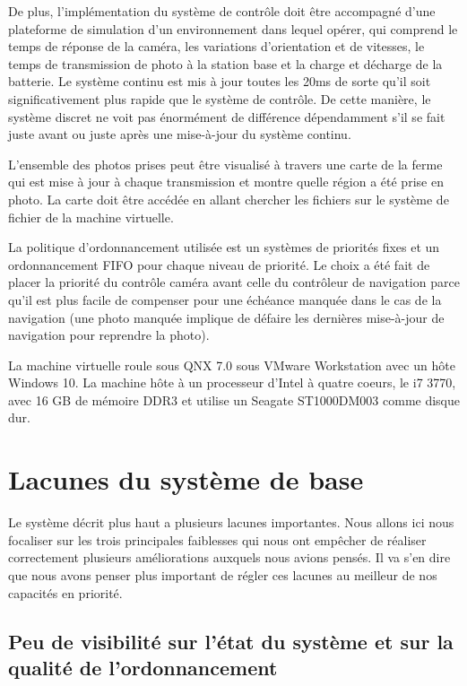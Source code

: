\documentclass[journal]{IEEEtran}
\begin{document}
De plus, l'implémentation du système de contrôle doit être accompagné d'une plateforme de simulation d'un environnement dans lequel opérer, qui comprend le temps de réponse de la caméra, les variations d'orientation et de vitesses, le temps de transmission de photo à la station base et la charge et décharge de la batterie. Le système continu est mis à jour toutes les 20ms de sorte qu'il soit significativement plus rapide que le système de contrôle. De cette manière, le système discret ne voit pas énormément de différence dépendamment s'il se fait juste avant ou juste après une mise-à-jour du système continu.

L'ensemble des photos prises peut être visualisé à travers une carte de la ferme qui est mise à jour à chaque transmission et montre quelle région a été prise en photo. La carte doit être accédée en allant chercher les fichiers sur le système de fichier de la machine virtuelle.

La politique d'ordonnancement utilisée est un systèmes de priorités fixes et un ordonnancement FIFO pour chaque niveau de priorité. Le choix a été fait de placer la priorité du contrôle caméra avant celle du contrôleur de navigation parce qu'il est plus facile de compenser pour une échéance manquée dans le cas de la navigation (une photo manquée implique de défaire les dernières mise-à-jour de navigation pour reprendre la photo).

La machine virtuelle roule sous QNX 7.0 sous VMware Workstation avec un hôte Windows 10. La machine hôte à un processeur d'Intel à quatre coeurs, le i7 3770, avec 16 GB de mémoire DDR3 et utilise un Seagate ST1000DM003 comme disque dur. 


\section{Lacunes du système de base}
\label{lacunes}

Le système décrit plus haut a plusieurs lacunes importantes. Nous allons ici nous focaliser sur les trois principales faiblesses qui nous ont empêcher de réaliser correctement plusieurs améliorations auxquels nous avions pensés. Il va s'en dire que nous avons penser plus important de régler ces lacunes au meilleur de nos capacités en priorité.

\subsection{Peu de visibilité sur l'état du système et sur la qualité de l'ordonnancement}
\end{document}
